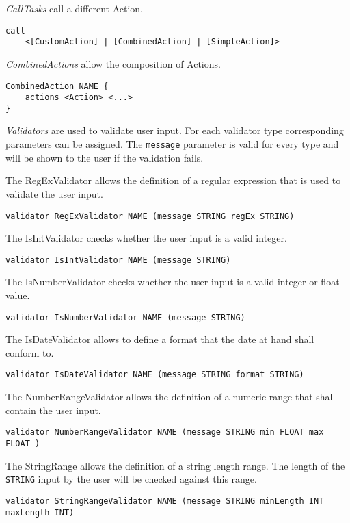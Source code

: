 \textit{CallTasks} call a different Action.
\begin{lstlisting}
call
	<[CustomAction] | [CombinedAction] | [SimpleAction]>
\end{lstlisting}

\textit{CombinedActions} allow the composition of Actions.
\begin{lstlisting}
CombinedAction NAME {
	actions <Action> <...>
}
\end{lstlisting}

\textit{Validators} are used to validate user input. For each validator type corresponding parameters can be assigned. The \lstinline!message! parameter is valid for every type and will be shown to the user if the validation fails.

The RegExValidator allows the definition of a regular expression that is used to validate the user input.
\begin{lstlisting}
validator RegExValidator NAME (message STRING regEx STRING)
\end{lstlisting}

The IsIntValidator checks whether the user input is a valid integer.
\begin{lstlisting}
validator IsIntValidator NAME (message STRING)
\end{lstlisting}

The IsNumberValidator checks whether the user input is a valid integer or float value.
\begin{lstlisting}
validator IsNumberValidator NAME (message STRING)
\end{lstlisting}

The IsDateValidator allows to define a format that the date at hand shall conform to.
\begin{lstlisting}
validator IsDateValidator NAME (message STRING format STRING)
\end{lstlisting}

The NumberRangeValidator allows the definition of a numeric range that shall contain the user input.
\begin{lstlisting}
validator NumberRangeValidator NAME (message STRING min FLOAT max FLOAT )
\end{lstlisting}

The StringRange allows the definition of a string length range. The length of the \lstinline!STRING! input by the user will be checked against this range.
\begin{lstlisting}
validator StringRangeValidator NAME (message STRING minLength INT maxLength INT)
\end{lstlisting}

